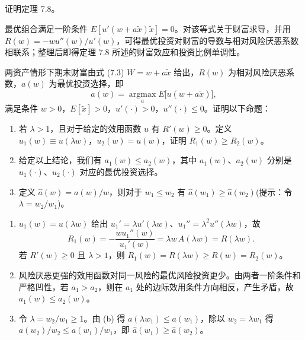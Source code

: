 \begin{problem}
 证明定理 7.8。
\end{problem}
\begin{solution}
最优组合满足一阶条件 $E[u'(w+a\tilde x)\tilde x]=0$。对该等式关于财富求导，并用 $R(w)=-wu''(w)/u'(w)$，可得最优投资对财富的导数与相对风险厌恶系数相联系；整理后即得定理 7.8 所述的财富效应和投资比例单调性。
\end{solution}
\begin{problem}
 两资产情形下期末财富由式 (7.3) $W=w+a\tilde{x}$ 给出，$R(w)$ 为相对风险厌恶系数，$a(w)$ 为最优投资选择，即
\[
    a(w)=\operatorname*{argmax}_{a} E\bigl[u(w+a\tilde{x})\bigr],
\]
满足条件 $w>0$，$E[\tilde{x}]>0$，$u'(\cdot)>0$，$u''(\cdot)\le 0$。证明以下命题：
\begin{enumerate}[label=(\alph*)]
    \item 若 $\lambda>1$，且对于给定的效用函数 $u$ 有 $R'(w)\ge 0$。定义 $u_1(w)\equiv u(\lambda w)$，$u_2(w)=u(w)$，证明 $R_1(w)\ge R_2(w)$。
    \item 给定以上结论，我们有 $a_1(w)\le a_2(w)$，其中 $a_1(w)$、$a_2(w)$ 分别是 $u_1(\cdot)$、$u_2(\cdot)$ 对应的最优投资选择。
    \item 定义 $\hat{a}(w)=a(w)/w$，则对于 $w_1\le w_2$ 有 $\hat{a}(w_1)\ge \hat{a}(w_2)$(提示：令 $\lambda=w_2/w_1$)。
\end{enumerate}
\end{problem}
\begin{solution}
\begin{enumerate}[label=(\alph*)]
\item $u_1(w)=u(\lambda w)$ 给出 $u_1'=\lambda u'(\lambda w)$、$u_1''=\lambda^2u''(\lambda w)$，故
\[
R_1(w)=-\frac{wu_1''(w)}{u_1'(w)}=\lambda w\,A(\lambda w)=R(\lambda w).
\]
若 $R'(w)\ge0$ 且 $\lambda>1$，则 $R_1(w)=R(\lambda w)\ge R(w)=R_2(w)$。
\item 风险厌恶更强的效用函数对同一风险的最优风险投资更少。由两者一阶条件和严格凹性，若 $a_1>a_2$，则在 $a_1$ 处的边际效用条件方向相反，产生矛盾，故 $a_1(w)\le a_2(w)$。
\item 令 $\lambda=w_2/w_1\ge1$。由 (b) 得 $a(\lambda w_1)\le a(w_1)$，除以 $w_2=\lambda w_1$ 得 $a(w_2)/w_2\le a(w_1)/w_1$，即 $\hat a(w_1)\ge\hat a(w_2)$。
\end{enumerate}
\end{solution}
